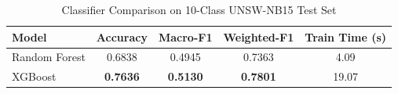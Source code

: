 \begin{table}[htbp]
\caption{Classifier Comparison on 10-Class UNSW-NB15 Test Set}
\label{tab:classifier_comparison}
\centering
\begin{tabular}{lcccc}
\hline
\textbf{Model} & \textbf{Accuracy} & \textbf{Macro-F1} & \textbf{Weighted-F1} & \textbf{Train Time (s)} \\
\hline
Random Forest & 0.6838 & 0.4945 & 0.7363 & 4.09 \\
XGBoost & \textbf{0.7636} & \textbf{0.5130} & \textbf{0.7801} & 19.07 \\
\hline
\end{tabular}
\end{table}
